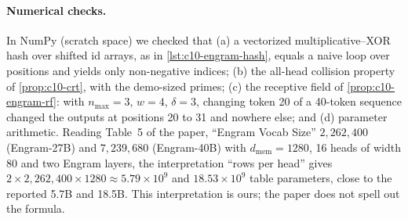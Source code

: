 \paragraph{Numerical checks.} In NumPy (scratch space) we checked that (a) a vectorized
multiplicative--XOR hash over shifted id arrays, as in \cref{lst:c10-engram-hash}, equals a naive
loop over positions and yields only non-negative indices; (b) the all-head collision property of
\cref{prop:c10-crt}, with the demo-sized primes; (c) the receptive field of
\cref{prop:c10-engram-rf}: with $n_{\max} = 3$, $w = 4$, $\delta = 3$, changing token 20 of a
40-token sequence changed the outputs at positions 20 to 31 and nowhere else; and (d) parameter
arithmetic. Reading Table~5 of the paper, ``Engram Vocab Size'' $2{,}262{,}400$ (Engram-27B) and
$7{,}239{,}680$ (Engram-40B) with $d_{\mathrm{mem}} = 1280$, 16 heads of width 80 and two Engram
layers, the interpretation ``rows per head'' gives $2 \times 2{,}262{,}400 \times 1280 \approx
5.79 \times 10^9$ and $18.53 \times 10^9$ table parameters, close to the reported 5.7B and 18.5B.
This interpretation is ours; the paper does not spell out the formula.

